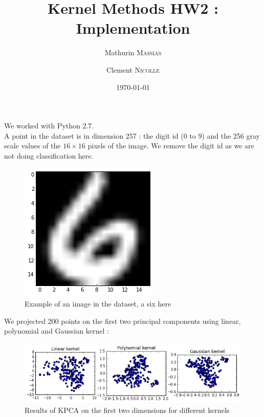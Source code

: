 \documentclass[11pt,a4paper]{article}
\begin{document}
\title{Kernel Methods HW2 : Implementation}
\author{Mathurin \textsc{Massias} \and Clement \textsc{Nicolle}}
\date{\today} 

\maketitle

\hspace{-6mm}

We worked with Python 2.7.
\\A point in the dataset is in dimension 257 : the digit id (0 to 9) and the 256 gray scale values of the $16 \times 16$ pixels of the image. We remove the digit id as we are not doing classification here.

\begin{figure}[H]
	\centering
	\noindent\includegraphics[scale=0.4]{six.png}
	\caption{Example of an image in the dataset, a six here}
\end{figure}

We projected 200 points on the first two principal components using linear, polynomial and Gaussian kernel :
\begin{figure}[H]
	\centering
	\noindent\includegraphics[scale=0.7]{kpca.png}
	\caption{Results of KPCA on the first two dimensions for different kernels}
\end{figure}
\end{document}

